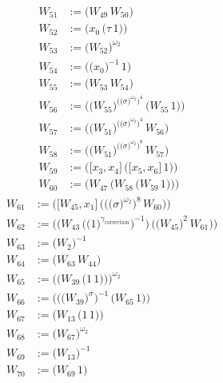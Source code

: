 \begin{align*}
W_{51} &:= \bigl(W_{49}\,W_{50}\bigr) \\
W_{52} &:= \bigl(x_{0}\,\bigl(\tau\,1\bigr)\bigr) \\
W_{53} &:= \bigl(W_{52}\bigr)^{\omega_2} \\
W_{54} &:= \bigl(\bigl(x_{0}\bigr)^{-1}\,1\bigr) \\
W_{55} &:= \bigl(W_{53}\,W_{54}\bigr) \\
W_{56} &:= \bigl(\bigl(W_{55}\bigr)^{\bigl(\bigl(\sigma\bigr)^{\omega_2}\bigr)^{4}}\,\bigl(W_{55}\,1\bigr)\bigr) \\
W_{57} &:= \bigl(\bigl(W_{51}\bigr)^{\bigl(\bigl(\sigma\bigr)^{\omega_2}\bigr)^{4}}\,W_{56}\bigr) \\
W_{58} &:= \bigl(\bigl(W_{51}\bigr)^{\bigl(\bigl(\sigma\bigr)^{\omega_2}\bigr)^{8}}\,W_{57}\bigr) \\
W_{59} &:= \bigl(\bigl[x_{3},x_{4}\bigr]\,\bigl(\bigl[x_{5},x_{6}\bigr]\,1\bigr)\bigr) \\
W_{60} &:= \bigl(W_{47}\,\bigl(W_{58}\,\bigl(W_{59}\,1\bigr)\bigr)\bigr)
\end{align*}
\begin{align*}
W_{61} &:= \bigl(\bigl[W_{45},x_{1}\bigr]\,\bigl(\bigl(\bigl(\sigma\bigr)^{\omega_2}\bigr)^{8}\,W_{60}\bigr)\bigr) \\
W_{62} &:= \bigl(\bigl(W_{43}\,\bigl(\bigl(1\bigr)^{\gamma_{\mathrm{correction}}}\bigr)^{-1}\bigr)\,\bigl(\bigl(W_{45}\bigr)^{2}\,W_{61}\bigr)\bigr) \\
W_{63} &:= \bigl(W_{2}\bigr)^{-1} \\
W_{64} &:= \bigl(W_{63}\,W_{44}\bigr) \\
W_{65} &:= \bigl(\bigl(W_{39}\,\bigl(1\,1\bigr)\bigr)\bigr)^{\omega_2} \\
W_{66} &:= \bigl(\bigl(\bigl(W_{39}\bigr)^{\sigma}\bigr)^{-1}\,\bigl(W_{65}\,1\bigr)\bigr) \\
W_{67} &:= \bigl(W_{13}\,\bigl(1\,1\bigr)\bigr) \\
W_{68} &:= \bigl(W_{67}\bigr)^{\omega_2} \\
W_{69} &:= \bigl(W_{13}\bigr)^{-1} \\
W_{70} &:= \bigl(W_{69}\,1\bigr)
\end{align*}
